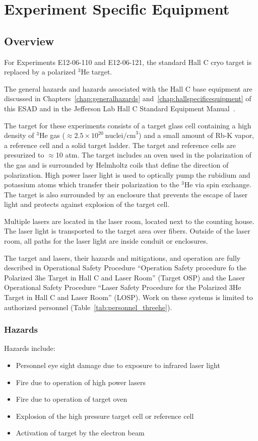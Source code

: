 \chapter{Experiment Specific Equipment}
\label{chap:expspecific}



\section{Overview}
For Experiments E12-06-110 and E12-06-121, the standard Hall C cryo
target is replaced by a polarized ${}^3$He target.

The general hazards and hazards associated with the Hall C base
equipment are discussed in Chapters~\ref{chap:generalhazards}
and~\ref{chap:hallspecificequipment} of this ESAD and in the Jefferson
Lab Hall C Standard Equipment Manual~\cite{HallCosp}.

The target for these experiments consists of a target glass cell containing a
high density of ${}^3$He gas
($\approx 2.5 \times 10^{20}~\textrm{nuclei/cm}^3$)
and a small amount of Rb-K vapor, a reference cell and a solid target
ladder.  The target and reference cells are presurized to $\approx$10 atm.
The target includes an oven used in the polarization of the
gas and is surrounded by Helmholtz coils that define the direction of
polarization.  High power laser light is used to optically pump the rubidium
and potassium atoms which transfer their polarization to the ${}^3$He
via spin exchange.
The target is also surrounded by an enclosure that prevents the escape of
laser light and protects against explosion of the target cell.

Multiple lasers are located in the laser room, located next to the counting
house.  The laser light is transported to the target area over
fibers.  Outside of the laser room, all paths for the laser light are
inside conduit or enclosures.

The target and lasers, their hazards and mitigations, and operation
are fully described in Operational Safety Procedure ``Operation Safety procedure fo the Polarized
3he Target in Hall C and Laser Room'' (Target OSP) and the Laser
Operational Safety Procedure ``Laser Safety Procedure for the
Polarized 3He Target in Hall C and Laser Room'' (LOSP).  Work on these
systems is limited to authorized personnel (Table~\ref{tab:personnel_threehe}).

\subsection{Hazards}
Hazards include:
\begin{itemize}
\item Personnel eye sight damage due to exposure to infrared laser
  light
\item Fire due to operation of high power lasers
\item Fire due to operation of target oven
\item Explosion of the high pressure target cell or reference cell
\item Activation of target by the electron beam
\end{itemize}

